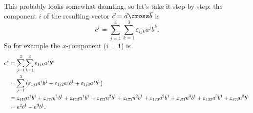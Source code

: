 This probably looks somewhat daunting, so let's take it step-by-step: the component $i$ of the resulting vector $\vec{c}=\vec{a}\cross\vec{b}$ is
\begin{equation}
  c^{i} = \sum\limits_{j=1}^{3}\sum\limits_{k=1}^{3}\varepsilon_{ijk}a^{j}b^{k}.
  \label{eq:cross_product_LCsymbol_component}
\end{equation}
So for example the $x$-component ($i=1$) is
\begin{align*}
  c^{x} &= \sum\limits_{j=1}^{3}\sum\limits_{k=1}^{3}\varepsilon_{1jk}a^{j}b^{k}\\
        &= \sum\limits_{j=1}^{3}\left(\varepsilon_{1j1}a^{j}b^{1} + \varepsilon_{1j2}a^{j}b^{1}+ \varepsilon_{1j3}a^{j}b^{1}\right)\\
        &= \cancel{\varepsilon_{111}}a^{1}b^{1} + \cancel{\varepsilon_{112}}a^{1}b^{1}+ \cancel{\varepsilon_{113}}a^{1}b^{1} + \cancel{\varepsilon_{121}}a^{2}b^{1} + \cancel{\varepsilon_{122}}a^{2}b^{1}+ \varepsilon_{123}a^{2}b^{1} + \cancel{\varepsilon_{131}}a^{3}b^{1} + \varepsilon_{132}a^{3}b^{1} + \cancel{\varepsilon_{133}}a^{3}b^{1}\\
        &= a^{2}b^{1} - a^{3}b^{1}.
\end{align*}



